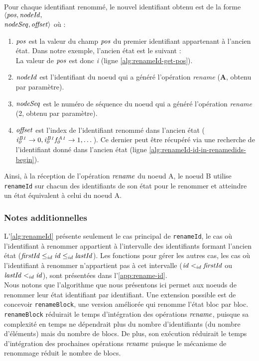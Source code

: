 Pour chaque identifiant renommé, le nouvel identifiant obtenu est de la forme $\langle \mathit{pos},\mathit{nodeId},$ \\ $\mathit{nodeSeq},\mathit{offset} \rangle$ où :
\begin{enumerate}
    \item $\mathit{pos}$ est la valeur du champ $\mathit{pos}$ du premier identifiant appartenant à l'ancien état.
        Dans notre exemple, l'ancien état est le suivant :
        \begin{equation*}
            [\betterid{i}{B1}{0},\betterid{i}{B1}{0}\betterid{f}{A1}{0},\betterid{i}{B1}{1},\betterid{i}{B1}{2}]
        \end{equation*}
        La valeur de $\mathit{pos}$ est donc \emph{i} (ligne \ref{alg:renameId-get-pos}).
    \item $\mathit{nodeId}$ est l'identifiant du noeud qui a généré l'opération \emph{rename} (\textbf{A}, obtenu par paramètre).
    \item $\mathit{nodeSeq}$ est le numéro de séquence du noeud qui a généré l'opération \emph{rename} (2, obtenu par paramètre).
    \item $\mathit{offset}$ est l'index de l'identifiant renommé dans l'ancien état ($\mathit{i}^{\mathit{B1}}_{\mathit{0}} \rightarrow 0,\mathit{i}^{\mathit{B1}}_{\mathit{0}}\mathit{f}^{\mathit{A1}}_{\mathit{0}} \rightarrow 1, \dots$).
    Ce dernier peut être récupéré via une recherche de l'identifiant donné dans l'ancien état (ligne \ref{alg:renameId-id-in-renamedids-begin}).
\end{enumerate}

Ainsi, à la réception de l'opération $\mathit{rename}$ du noeud A, le noeud B utilise \texttt{renameId} sur chacun des identifiants de son état pour le renommer et atteindre un état équivalent à celui du noeud A.\\

\subsubsection{Notes additionnelles}

L'\autoref{alg:renameId} présente seulement le cas principal de \texttt{renameId}, \ie le cas où l'identifiant à renommer appartient à l'intervalle des identifiants formant l'ancien état ($\mathit{firstId} \leq_{id} \mathit{id} \leq_{id} \mathit{lastId}$).
Les fonctions pour gérer les autres cas, \ie les cas où l'identifiant à renommer n'appartient pas à cet intervalle ($\mathit{id} <_{id} \mathit{firstId}$ ou $\mathit{lastId} <_{id} \mathit{id}$), sont présentées dans l'\autoref{app:rename-id}.\\

Nous notons que l'algorithme que nous présentons ici permet aux noeuds de renommer leur état identifiant par identifiant.
Une extension possible est de concevoir \texttt{renameBlock}, une version améliorée qui renomme l'état bloc par bloc.
\texttt{renameBlock} réduirait le temps d'intégration des opérations $\mathit{rename}$, puisque sa complexité en temps ne dépendrait plus du nombre d'identifiants (\ie du nombre d'éléments) mais du nombre de blocs.
De plus, son exécution réduirait le temps d'intégration des prochaines opérations $\mathit{rename}$ puisque le mécanisme de renommage réduit le nombre de blocs.
